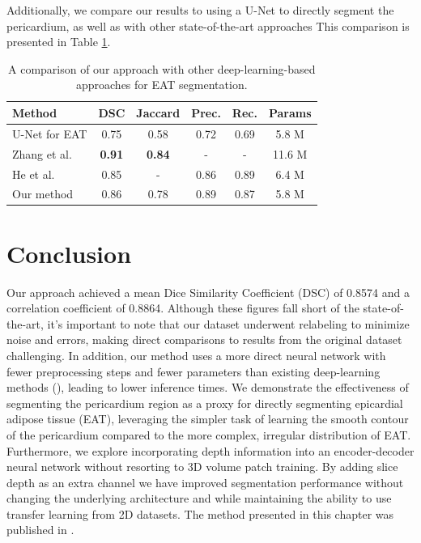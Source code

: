 Additionally, we compare our results to using a U-Net to directly segment the pericardium, as well as with other state-of-the-art approaches This comparison is presented in Table \ref{tab:comparison}.

\begin{table}[t!]
\renewcommand{\arraystretch}{1.4}
\caption{A comparison of our approach with other deep-learning-based approaches for EAT segmentation.}
\centering
\begin{tabularx}{\textwidth}{Xccccc} 
 Method & DSC & Jaccard & Prec. & Rec. & Params \\
 \hline
 U-Net for EAT & 0.75 & 0.58 & 0.72 & 0.69 & 5.8 M \\ 
 Zhang et al. \cite{Zhang2020} & \textbf{0.91} & \textbf{0.84} & - & - & 11.6 M \\
 He et al. \cite{he2020} & 0.85 & - & 0.86 & 0.89 & 6.4 M \\
 Our method & 0.86 & 0.78 & 0.89 & 0.87 & 5.8 M \\
\end{tabularx}
\label{tab:comparison}
\end{table}

\section{Conclusion}\label{conclusion}

Our approach achieved a mean Dice Similarity Coefficient (DSC) of 0.8574 and a correlation coefficient of 0.8864. Although these figures fall short of the state-of-the-art, it's important to note that our dataset underwent relabeling to minimize noise and errors, making direct comparisons to results from the original dataset challenging. In addition, our method uses a more direct neural network with fewer preprocessing steps and fewer parameters than existing deep-learning methods (\cite{Commandeur2018, Li2019, he2020}), leading to lower inference times.  We demonstrate the effectiveness of segmenting the pericardium region as a proxy for directly segmenting epicardial adipose tissue (EAT), leveraging the simpler task of learning the smooth contour of the pericardium compared to the more complex, irregular distribution of EAT. Furthermore, we explore incorporating depth information into an encoder-decoder neural network without resorting to 3D volume patch training. By adding slice depth as an extra channel we have improved segmentation performance without changing the underlying architecture and while maintaining the ability to use transfer learning from 2D datasets. The method presented in this chapter was published in \cite{bencevicEpicardialAdiposeTissue2021}.
